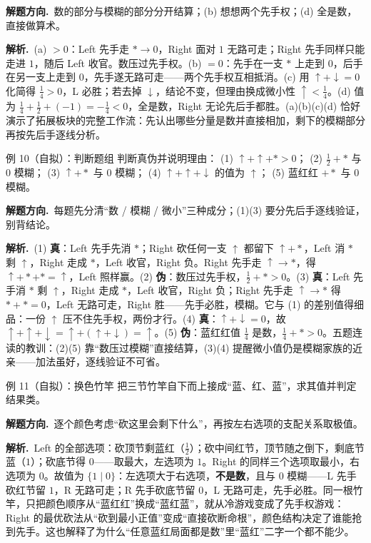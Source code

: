 \documentclass[UTF8,a4paper,11pt,oneside,openany,fontset=fandol]{ctexbook}
\theoremstyle{definition}
\newcommand{\sol}{\par\noindent\textbf{解析.}\ }
\newcommand{\hint}{\par\noindent\textbf{解题方向.}\ }
\begin{document}
\hint 数的部分与模糊的部分分开结算；(b) 想想两个先手权；(d) 全是数，直接做算术。

\sol (a) $>0$：Left 先手走 $\ast\to0$，Right 面对 $1$ 无路可走；Right 先手同样只能走进 $1$，随后 Left 收官。数压过先手权。(b) $=0$：先手在一支 $\ast$ 上走到 $0$，后手在另一支上走到 $0$，先手遂无路可走——两个先手权互相抵消。(c) 用 $\uparrow+\downarrow=0$ 化简得 $\tfrac14>0$，L 必胜；若去掉 $\downarrow$，结论不变，但理由换成微小性 $\uparrow<\tfrac14$。(d) 值为 $\tfrac14+\tfrac12+(-1)=-\tfrac14<0$，全是数，Right 无论先后手都胜。(a)(b)(c)(d) 恰好演示了拓展板块的完整工作流：先认出哪些分量是数并直接相加，剩下的模糊部分再按先后手逐线分析。

\begin{problem}{例 10（自拟）：判断题组}
判断真伪并说明理由：
(1) $\uparrow+\uparrow+\ast>0$；
(2) $\tfrac12+\ast$ 与 $0$ 模糊；
(3) $\uparrow+\ast$ 与 $0$ 模糊；
(4) $\uparrow+\uparrow+\downarrow$ 的值为 $\uparrow$；
(5) 蓝红红 $+\ast$ 与 $0$ 模糊。
\end{problem}

\hint 每题先分清“数 / 模糊 / 微小”三种成分；(1)(3) 要分先后手逐线验证，别背结论。

\sol (1) \textbf{真}：Left 先手先消 $\ast$；Right 砍任何一支 $\uparrow$ 都留下 $\uparrow+\ast$，Left 消 $\ast$ 剩 $\uparrow$，Right 走成 $\ast$，Left 收官，Right 负。Right 先手走 $\uparrow\to\ast$，得 $\uparrow+\ast+\ast=\uparrow$，Left 照样赢。(2) \textbf{伪}：数压过先手权，$\tfrac12+\ast>0$。(3) \textbf{真}：Left 先手消 $\ast$ 剩 $\uparrow$，Right 走成 $\ast$，Left 收官，Right 负；Right 先手走 $\uparrow\to\ast$ 得 $\ast+\ast=0$，Left 无路可走，Right 胜——先手必胜，模糊。它与 (1) 的差别值得细品：一份 $\uparrow$ 压不住先手权，两份才行。(4) \textbf{真}：$\uparrow+\downarrow=0$，故 $\uparrow+\uparrow+\downarrow=\uparrow+(\uparrow+\downarrow)=\uparrow$。(5) \textbf{伪}：蓝红红值 $\tfrac14$ 是数，$\tfrac14+\ast>0$。五题连读的教训：(2)(5) 靠“数压过模糊”直接结算，(3)(4) 提醒微小值仍是模糊家族的近亲——加法虽好，逐线验证不可省。

\begin{problem}{例 11（自拟）：换色竹竿}
把三节竹竿自下而上接成“蓝、红、蓝”，求其值并判定结果类。
\end{problem}

\hint 逐个颜色考虑“砍这里会剩下什么”，再按左右选项的支配关系取极值。

\sol Left 的全部选项：砍顶节剩蓝红（$\tfrac12$）；砍中间红节，顶节随之倒下，剩底节蓝（$1$）；砍底节得 $0$——取最大，左选项为 $1$。Right 的同样三个选项取最小，右选项为 $0$。故值为 $\{1\mid 0\}$：左选项大于右选项，\textbf{不是数}，且与 $0$ 模糊——L 先手砍红节留 $1$，R 无路可走；R 先手砍底节留 $0$，L 无路可走，先手必胜。同一根竹竿，只把颜色顺序从“蓝红红”换成“蓝红蓝”，就从冷游戏变成了先手权游戏：Right 的最优砍法从“砍到最小正值”变成“直接砍断命根”，颜色结构决定了谁能抢到先手。这也解释了为什么“任意蓝红局面都是数”里“蓝红”二字一个都不能少。
\end{document}
